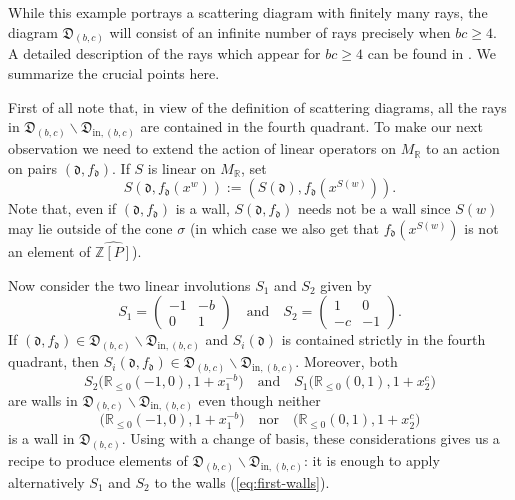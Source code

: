 \documentclass[11pt]{amsart}
\newcommand{\sayDR}[1]{\say[DR]{#1}}
\theoremstyle{remark}
\numberwithin{equation}{section}
\newcommand{\RR}{\mathbb{R}}
\newcommand{\ZZ}{\mathbb{Z}}
\newcommand{\fd}{\mathfrak{d}}
\newcommand{\fD}{\mathfrak{D}}
\begin{document}
While this example portrays a scattering diagram with finitely many rays, the diagram $\fD_{(b,c)}$ will consist of an infinite number of rays precisely when $bc\ge 4$. A detailed description of the rays
which appear for $bc\ge4$ can be found in \cite[Example 1.30]{GHKK}.
We summarize the crucial points here.

First of all note that, in view of the definition of scattering diagrams, all the
rays in  $\fD_{(b,c)} \smallsetminus \fD_{\mathrm{in},(b,c)}$ are contained in the
fourth quadrant.  To make our next observation we need to extend the action of
linear operators on $M_\RR$ to an action on pairs $(\fd,f_\fd)$. If $S$ is
linear on $M_\RR$, set
\begin{equation}
  \label{eqn:linear action}
  S(\fd,f_\fd(x^w))
  :=
  \left( S(\fd), f_\fd\left(x^{S(w)}\right) \right).
\end{equation}
Note that, even if $(\fd,f_\fd)$ is a wall, $S(\fd,f_\fd)$ needs not be a wall
since $S(w)$ may lie outside of the cone $\sigma$ (in which case we also get
that  $f_\fd\left(x^{S(w)}\right)$ is not an element of $\widehat{\ZZ [P]}$).

Now consider the two linear involutions $S_1$ and $S_2$ given by
\[
  S_1 =  
  \begin{pmatrix}
    -1 & -b \\
    0& 1
  \end{pmatrix}
  \quad
  \mbox{and}
  \quad
  S_2 =  
  \begin{pmatrix}
    1 & 0 \\
    -c & -1
  \end{pmatrix}.
\]
If $(\fd, f_{\fd}) \in \fD_{(b,c)} \smallsetminus \fD_{\mathrm{in},(b,c)}$ and $S_i
(\fd)$ is contained strictly in the fourth quadrant, then $S_i(\fd, f_{\fd}) \in
\fD_{(b,c)} \smallsetminus \fD_{\mathrm{in},(b,c)}$. Moreover, both 
\begin{equation}
  \label{eq:first-walls}
  S_2\big(\RR_{\leq 0}(-1,0),1+x_1^{-b}\big)
  \quad
  \mbox{and}
  \quad
  S_1\big(\RR_{\leq 0}(0,1),1+x_2^c\big)
\end{equation}
are walls in $\fD_{(b,c)} \smallsetminus \fD_{\mathrm{in},(b,c)}$ even though
neither 
\[
  \big(\RR_{\leq 0}(-1,0),1+x_1^{-b}\big)
  \quad
  \mbox{nor}
  \quad
  \big(\RR_{\leq 0}(0,1),1+x_2^c\big)
\]
is a wall in $\fD_{(b,c)}$. Using \cite[Section 4]{GP} with a change of basis, these considerations gives us a recipe to produce
elements of $\fD_{(b,c)} \smallsetminus \fD_{\mathrm{in},(b,c)}$: it is enough to apply
alternatively $S_1$ and $S_2$ to the walls (\ref{eq:first-walls}).
\end{document}
